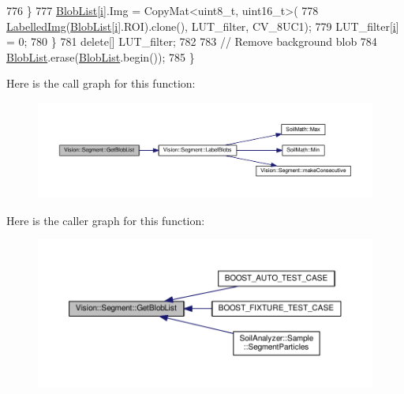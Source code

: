 \begin{DoxyCode}
776     \}
777     \hyperlink{class_vision_1_1_segment_a74e0600a7dd49bd7110ee27bb4cd6e0e}{BlobList}[\hyperlink{_comparision_pictures_2_createtest_image_8m_a6f6ccfcf58b31cb6412107d9d5281426}{i}].Img = CopyMat<uint8\_t, uint16\_t>(
778         \hyperlink{class_vision_1_1_segment_a4daa143f6cd4a753d3bbe45c6a67d27f}{LabelledImg}(\hyperlink{class_vision_1_1_segment_a74e0600a7dd49bd7110ee27bb4cd6e0e}{BlobList}[\hyperlink{_comparision_pictures_2_createtest_image_8m_a6f6ccfcf58b31cb6412107d9d5281426}{i}].ROI).clone(), LUT\_filter, CV\_8UC1);
779     LUT\_filter[\hyperlink{_comparision_pictures_2_createtest_image_8m_a6f6ccfcf58b31cb6412107d9d5281426}{i}] = 0;
780   \}
781   \textcolor{keyword}{delete}[] LUT\_filter;
782 
783   \textcolor{comment}{// Remove background blob}
784   \hyperlink{class_vision_1_1_segment_a74e0600a7dd49bd7110ee27bb4cd6e0e}{BlobList}.erase(\hyperlink{class_vision_1_1_segment_a74e0600a7dd49bd7110ee27bb4cd6e0e}{BlobList}.begin());
785 \}
\end{DoxyCode}


Here is the call graph for this function\+:\nopagebreak
\begin{figure}[H]
\begin{center}
\leavevmode
\includegraphics[width=350pt]{class_vision_1_1_segment_a6dba1b8506fe7e8054e99ea5330d4abc_cgraph}
\end{center}
\end{figure}




Here is the caller graph for this function\+:\nopagebreak
\begin{figure}[H]
\begin{center}
\leavevmode
\includegraphics[width=350pt]{class_vision_1_1_segment_a6dba1b8506fe7e8054e99ea5330d4abc_icgraph}
\end{center}
\end{figure}


